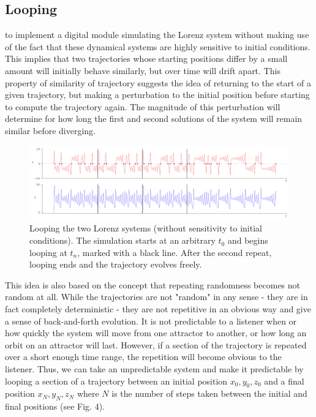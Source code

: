 \documentclass{tufte-handout}
\begin{document}
\subsection{Looping}\label{sec:looping}

 to implement a digital module simulating the Lorenz system without making use of the fact that these dynamical systems are highly sensitive to initial conditions. This implies that two trajectories whose starting positions differ by a small amount will initially behave similarly, but over time will drift apart.
This property of similarity of trajectory suggests the idea of returning to the start of a given trajectory, but making a perturbation to the initial position before starting to compute the trajectory again. The magnitude of this perturbation will determine for how long the first and second solutions of the system will remain similar before diverging.

\begin{figure}[h]
  \includegraphics[width=\linewidth]{looping_voltages.png}%
  \caption{Looping the two Lorenz systems (without sensitivity to initial conditions). The simulation starts at an arbitrary $t_0$ and begins looping at $t_n$, marked with a black line. After the second repeat, looping ends and the trajectory evolves freely.}%
  \label{fig:looping_voltages}%
\end{figure}

This idea is also based on the concept that repeating randomness becomes not random at all. While the trajectories are not "random" in any sense - they are in fact completely deterministic - they are not repetitive in an obvious way and give a sense of back-and-forth evolution. It is not predictable to a listener when or how quickly the system will move from one attractor to another, or how long an orbit on an attractor will last. However, if a section of the trajectory is repeated over a short enough time range, the repetition will become obvious to the listener. Thus, we can take an unpredictable system and make it predictable by looping a section of a trajectory between an initial position $x_0, y_0, z_0$ and a final position $x_N, y_N, z_N$ where $N$ is the number of steps taken between the initial and final positions (see Fig. 4). 
\end{document}
